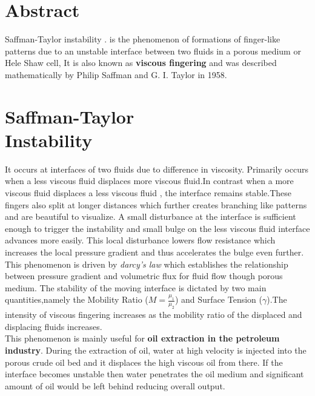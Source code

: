 \documentclass[12pt,a4paper]{article}
\begin{document}
\begin{multicols}{2}
\section{Abstract}
Saffman-Taylor instability \cite{SaffmanTaylor1958}. is the phenomenon of formations of finger-like patterns due to an unstable interface between two fluids in a porous medium or Hele Shaw cell, It is also known as \textbf{viscous fingering} and was described mathematically by Philip Saffman and G. I. Taylor in 1958.
\section{Saffman-Taylor  \\ 
Instability}
It occurs at interfaces of two fluids due to difference in viscosity. Primarily occurs when a less viscous fluid displaces more viscous fluid.In contrast when a more viscous fluid displaces a less viscous fluid , the interface remains stable.These fingers also split at longer distances which further creates branching like patterns and are beautiful to visualize. A small disturbance at the interface is sufficient enough to trigger the instability and small bulge on the less viscous fluid interface advances more easily. This local disturbance lowers flow resistance which increases the local pressure gradient and thus accelerates the bulge even further.  \\
\noindent\hspace*{2em}This phenomenon is driven by \textit{darcy's law} which establishes the relationship between pressure gradient and volumetric flux for fluid flow though porous medium. The stability of the moving interface is dictated by two main quantities,namely the Mobility Ratio ($M = \frac{\mu_{1}}{\mu_{2}}$) and Surface Tension ($\gamma$).The intensity of viscous fingering increases as the mobility ratio of the displaced and displacing fluids increases. \\
\noindent\hspace*{2em}This phenomenon is mainly useful for \textbf{oil extraction in the petroleum industry}. During the extraction of oil, water at high velocity is injected into the porous crude oil bed and it displaces the high viscous oil from there. If the interface becomes unstable then water penetrates the oil medium and significant amount of oil would be left behind reducing overall output.



\end{multicols}
\end{document}
